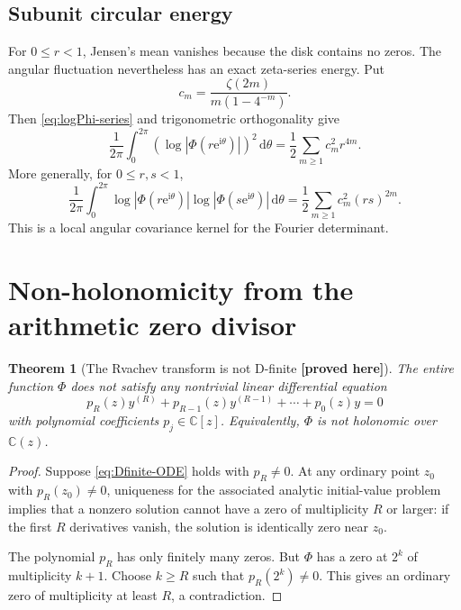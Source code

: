 \documentclass[11pt,oneside]{article}
\newtheorem{theorem}{Theorem}[section]
\theoremstyle{definition}
\theoremstyle{remark}
\newcommand{\C}{\mathbb C}
\newcommand{\e}{\mathrm e}
\newcommand{\ii}{\mathrm i}
\newcommand{\dd}{\,\mathrm d}
\newcommand{\New}{\textcolor{amber}{\textbf{[proved here]}}}
\begin{document}
\subsection{Subunit circular energy}

For $0\le r<1$, Jensen's mean vanishes because the disk contains no zeros.  The angular
fluctuation nevertheless has an exact zeta-series energy.  Put
\begin{equation}
 c_m=\frac{\zeta(2m)}{m(1-4^{-m})}.                       \label{eq:cm}
\end{equation}
Then \eqref{eq:logPhi-series} and trigonometric orthogonality give
\begin{equation}
 \boxed{\quad
 \frac1{2\pi}\int_0^{2\pi}
 \left(\log|\Phi(r\e^{\ii\theta})|\right)^2\dd\theta
 =\frac12\sum_{m\ge1}c_m^2r^{4m}.
 \quad}                                                  \label{eq:J-energy}
\end{equation}
More generally, for $0\le r,s<1$,
\begin{equation}
 \frac1{2\pi}\int_0^{2\pi}
 \log|\Phi(r\e^{\ii\theta})|
 \log|\Phi(s\e^{\ii\theta})|\dd\theta
 =\frac12\sum_{m\ge1}c_m^2(rs)^{2m}.                   \label{eq:J-covariance}
\end{equation}
This is a local angular covariance kernel for the Fourier determinant.

\section{Non-holonomicity from the arithmetic zero divisor}
\label{sec:nonDfinite}

\begin{theorem}[The Rvachev transform is not D-finite \New]
The entire function $\Phi$ does not satisfy any nontrivial linear differential equation
\begin{equation}
 p_R(z)y^{(R)}+p_{R-1}(z)y^{(R-1)}+\cdots+p_0(z)y=0       \label{eq:Dfinite-ODE}
\end{equation}
with polynomial coefficients $p_j\in\C[z]$.  Equivalently, $\Phi$ is not holonomic over
$\C(z)$.
\end{theorem}

\begin{proof}
Suppose \eqref{eq:Dfinite-ODE} holds with $p_R\ne0$.  At any ordinary point
$z_0$ with $p_R(z_0)\ne0$, uniqueness for the associated analytic initial-value problem
implies that a nonzero solution cannot have a zero of multiplicity $R$ or larger: if the
first $R$ derivatives vanish, the solution is identically zero near $z_0$.

The polynomial $p_R$ has only finitely many zeros.  But $\Phi$ has a zero at $2^k$ of
multiplicity $k+1$.  Choose $k\ge R$ such that $p_R(2^k)\ne0$.  This gives an ordinary zero
of multiplicity at least $R$, a contradiction.
\end{proof}
\end{document}
